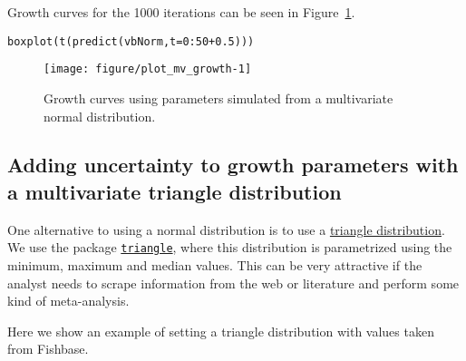 \documentclass[a4paper,english,10pt]{article}\usepackage[]{graphicx}\usepackage[]{color}
\makeatletter
\def\maxwidth{ %
  \ifdim\Gin@nat@width>\linewidth
    \linewidth
  \else
    \Gin@nat@width
  \fi
}
\newcommand{\hlnum}[1]{\textcolor[rgb]{0.2,0.2,0.2}{#1}}%
\newcommand{\hlopt}[1]{\textcolor[rgb]{0.2,0.2,0.2}{#1}}%
\newcommand{\hlstd}[1]{\textcolor[rgb]{0,0,0}{#1}}%
\newcommand{\hlkwc}[1]{\textcolor[rgb]{0.361,0.506,0.596}{#1}}%
\newcommand{\hlkwd}[1]{\textcolor[rgb]{0.361,0.506,0.596}{#1}}%
\newenvironment{kframe}{%
 \def\at@end@of@kframe{}%
 \ifinner\ifhmode%
  \def\at@end@of@kframe{\end{minipage}}%
  \begin{minipage}{\columnwidth}%
 \fi\fi%
 \def\FrameCommand##1{\hskip\@totalleftmargin \hskip-\fboxsep
 \colorbox{shadecolor}{##1}\hskip-\fboxsep
     \hskip-\linewidth \hskip-\@totalleftmargin \hskip\columnwidth}%
 \MakeFramed {\advance\hsize-\width
   \@totalleftmargin\z@ \linewidth\hsize
   \@setminipage}}%
 {\par\unskip\endMakeFramed%
 \at@end@of@kframe}
\newenvironment{knitrout}{}{} %
\newcommand{\pkg}[1]{{\texttt{#1}}}
\makeatother
\begin{document}
Growth curves for the 1000 iterations can be seen in Figure~\ref{fig:plot_mv_growth}.

\begin{knitrout}
\color{fgcolor}\begin{kframe}
\begin{alltt}
\hlkwd{boxplot}\hlstd{(}\hlkwd{t}\hlstd{(}\hlkwd{predict}\hlstd{(vbNorm,} \hlkwc{t}\hlstd{=}\hlnum{0}\hlopt{:}\hlnum{50}\hlopt{+}\hlnum{0.5}\hlstd{)))}
\end{alltt}
\end{kframe}\begin{figure}[H]

{\centering \texttt{[image: figure/plot\_mv\_growth-1]} 

}

\caption[Growth curves using parameters simulated from a multivariate normal distribution]{Growth curves using parameters simulated from a multivariate normal distribution.\label{fig:plot_mv_growth}}
\end{figure}


\end{knitrout}

\subsection{Adding uncertainty to growth parameters with a multivariate triangle distribution}
\label{sec:growth_triangle_cop}

One alternative to using a normal distribution is to use a \href{http://en.wikipedia.org/wiki/Triangle\_distribution}{triangle distribution}. We use the package \href{http://cran.r-project.org/web/packages/triangle/index.html}{\pkg{triangle}}, where this distribution is parametrized using the minimum, maximum and median values. This can be very attractive if the analyst needs to scrape information from the web or literature and perform some kind of meta-analysis.

Here we show an example of setting a triangle distribution with values taken from Fishbase.
\end{document}
